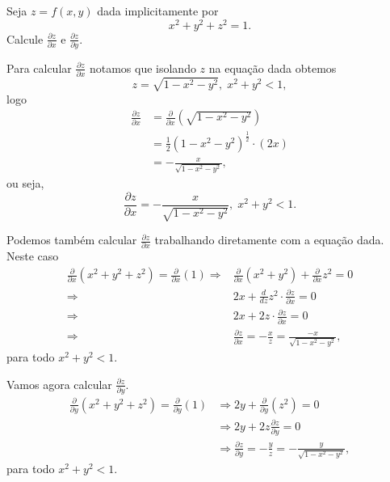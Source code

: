 \begin{example}
    Seja \(z = f(x,y)\) dada implicitamente por \[x^2 + y^2 + z^2 = 1.\] Calcule \(\frac{\partial z}{\partial x}\) e \(\frac{\partial z}{\partial y}\).

    Para calcular \(\frac{\partial z}{\partial x}\) notamos que isolando \(z\) na equação dada obtemos \[z = \sqrt{1 - x^2 - y^2},\; x^2 + y^2 < 1,\] logo
        \begin{align*}
            \frac{\partial z}{\partial x} 
                & = \frac{\partial}{\partial x} \left( \sqrt{1-x^2-y^2} \right) \\
                & = \frac{1}{2}(1-x^2-y^2)^\frac{1}{2}\cdot(2x) \\
                & = -\frac{x}{\sqrt{1-x^2-y^2}},
        \end{align*}
    ou seja, \[\frac{\partial z}{\partial x} = - \frac{x}{\sqrt{1-x^2-y^2}},\; x^2 + y^2 < 1.\]

    Podemos também calcular \(\frac{\partial z}{\partial x}\) trabalhando diretamente com a equação dada. Neste caso
        \begin{align*}
            \frac{\partial}{\partial x} (x^2 + y^2 + z^2) = \frac{\partial}{\partial x}(1)
            \Rightarrow & \frac{\partial}{\partial x} (x^2 + y^2) + \frac{\partial}{\partial x} z^2 = 0 \\
            \Rightarrow & 2x + \frac{d}{dz}z^2\cdot\frac{\partial z}{\partial x} = 0 \\
            \Rightarrow & 2x + 2z\cdot\frac{\partial z}{\partial x} = 0 \\
            \Rightarrow & \frac{\partial z}{\partial x} = -\frac{x}{z} = \frac{-x}{\sqrt{1-x^2-y^2}},
        \end{align*}
    para todo \( x^2 + y^2 < 1.\)

    Vamos agora calcular \(\frac{\partial z}{\partial y}\).
        \begin{align*}
            \frac{\partial}{\partial y} (x^2 + y^2 + z^2) = \frac{\partial}{\partial y}(1)
                & \Rightarrow 2y + \frac{\partial}{\partial y}(z^2) = 0 \\
                & \Rightarrow 2y + 2z \frac{\partial z}{\partial y} = 0 \\
                & \Rightarrow \frac{\partial z}{\partial y} = -\frac{y}{z} = -\frac{y}{\sqrt{1-x^2-y^2}},
        \end{align*}
    para todo \( x^2 + y^2 < 1.\)
\end{example}

